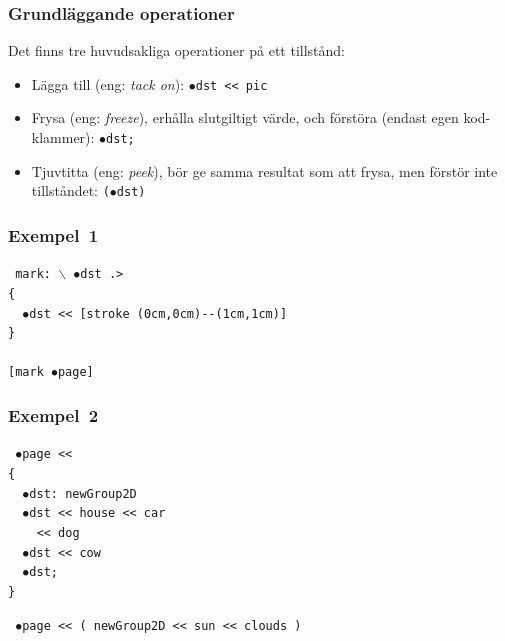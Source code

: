 \documentclass[noamsthm,handout]{beamer}
\newcommand{\inEnglish}[1]{(eng: \emph{#1})}
\begin{document}
\begin{frame}\frametitle{Grundläggande operationer}
  Det finns tre huvudsakliga operationer på ett tillstånd:
  \begin{itemize}
  \item
    Lägga till \inEnglish{tack on}: \texttt{$\bullet$dst {\color{red}<{}<{}} pic}
  \item
    Frysa \inEnglish{freeze}, erhålla slutgiltigt värde, och förstöra (endast egen kod-klammer): \texttt{$\bullet$dst{\color{red};}}
  \item
    Tjuvtitta \inEnglish{peek}, bör ge samma resultat som att frysa, men förstör inte tillståndet: \texttt{{\color{red}(}$\bullet$dst{\color{red})}}
  \end{itemize}
  
\end{frame}

\begin{frame}\frametitle{Exempel~1}
\texttt{%
mark: $\backslash$ {\color{red}$\bullet$}dst .>\\
\{\\
\ \ {\color{red}$\bullet$}dst {\color{red}<{}<{}} [stroke (0cm,0cm)-{}-(1cm,1cm)]\\
\}\\
\ \\
{}[{}mark {\color{red}$\bullet$}page{}]{}\\
}
\end{frame}

\begin{frame}\frametitle{Exempel~2}
\texttt{%
$\bullet$page <{}<\\
{\color{red}\{}\\
\ \ $\bullet$dst: {\color{red}newGroup2D}\\
\ \ $\bullet$dst <{}<{} house <{}<{} car\\
\ \ \ \ <{}<{} dog\\
\ \ $\bullet$dst <{}<{} cow\\
\ \ $\bullet$dst;\\
{\color{red}\}}
}

\texttt{%
$\bullet$page <{}< {\color{red}(} newGroup2D <{}< sun <{}< clouds {\color{red})}\\
}
\end{frame}
\end{document}
